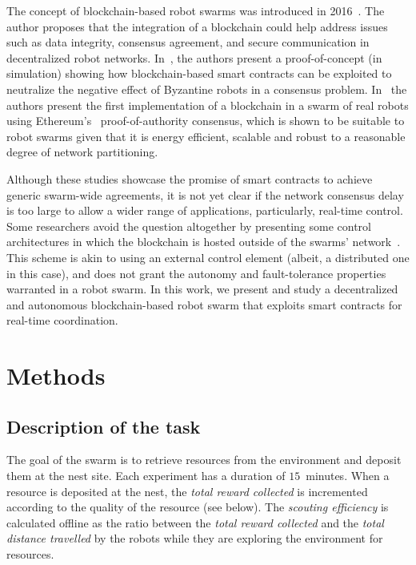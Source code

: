 \documentclass[runningheads]{llncs}
\newcommand{\poa}{proof-of-authority\xspace}
\begin{document}
The concept of blockchain-based robot swarms was introduced in 2016~\cite{ferrer_blockchain_2016}. The author proposes that the integration of a blockchain could help address issues such as data integrity, consensus agreement, and secure communication in decentralized robot networks. In~\cite{StrCasDor2018_aamas,StrCasDor2020_frontiers}, the authors present a proof-of-concept (in simulation) showing how blockchain-based smart contracts can be exploited to neutralize the negative effect of Byzantine robots in a consensus problem. In~\cite{PacStrDor2020:ants} the authors present the first implementation of a blockchain in a swarm of real robots using Ethereum's~\cite{buterin_2014_ethereum} \poa consensus, which is shown to be suitable to robot swarms given that it is energy efficient, scalable and robust to a reasonable degree of network partitioning.

 Although these studies showcase the promise of smart contracts to achieve generic swarm-wide agreements, it is not yet clear if the network consensus delay is too large to allow a wider range of applications, particularly, real-time control. Some researchers avoid the question altogether by presenting some control architectures in which the blockchain is hosted outside of the swarms' network~\cite{outsidehosting}. This scheme is akin to using an external control element (albeit, a distributed one in this case), and does not grant the autonomy and fault-tolerance properties warranted in a robot swarm. In this work, we present and study a decentralized and autonomous blockchain-based robot swarm that exploits smart contracts for real-time coordination.

\section{Methods}
\label{sec:methods}

\subsection{Description of the task} 
The goal of the swarm is to retrieve resources from the environment and deposit them at the nest site. Each experiment has a duration of $15$~minutes. When a resource is deposited at the nest, the \emph{total reward collected} is incremented according to the quality of the resource (see below). The \emph{scouting efficiency} is calculated offline as the ratio between the \emph{total reward collected} and the \emph{total distance travelled} by the robots while they are exploring the environment for resources. 
\end{document}
